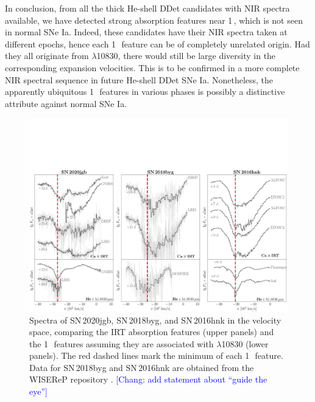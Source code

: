 \documentclass[twocolumn]{aastex631}
\newcommand{\sn}{SN\,2020jgb}
\newcommand{\chang}[1]{\textcolor{blue}{[Chang: #1]}}
\begin{document}
In conclusion, from all the thick He-shell DDet candidates with NIR spectra available, we have detected strong absorption features near 1\,\micron, which is not seen in normal SNe Ia. Indeed, these candidates have their NIR spectra taken at different epochs, hence each 1\,\micron\ feature can be of completely unrelated origin. Had they all originate from  $\lambda$10830, there would still be large diversity in the corresponding expansion velocities. This is to be confirmed in a more complete NIR spectral sequence in future He-shell DDet SNe Ia. Nonetheless, the apparently ubiquitous 1\,\micron\ features in various phases is possibly a distinctive attribute against normal SNe Ia.

\begin{figure}
    \centering
    \includegraphics[width=\textwidth]{CaII_HeI_hvf.pdf}
    \caption{Spectra of \sn, SN\,2018byg, and SN\,2016hnk in the velocity space, comparing the  IRT absorption features (upper panels) and the 1\,\micron\ features assuming they are associated with  $\lambda$10830 (lower panels). The red dashed lines mark the minimum of each 1\,\micron\ feature. Data for SN\,2018byg and SN\,2016hnk are obtained from the WISEReP repository \citep{wiserep_2012}. \chang{add statement about ``guide the eye''}}
    \label{fig:hvf_comp}
\end{figure}
\end{document}
